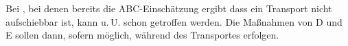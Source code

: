 {\begin{minipage}[t]{\linewidth -
{2\fboxrule} - {2\fboxsep}}
\begin{minipage}[t]{\linewidth}
{\begin{center}
{Bei , bei denen bereits die 
ABC-Einschätzung ergibt dass ein Transport nicht aufschiebbar ist, 
kann u.\,U. schon  getroffen werden. 
Die Maßnahmen von D und E sollen dann, sofern möglich, während des 
Transportes erfolgen. }
\end{center}
}
\end{minipage}
\end{minipage}%
}






\vfill
\restoregeometry\pagestyle{fancy}






    	








